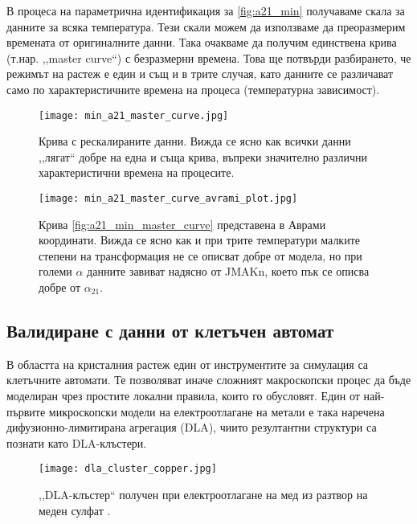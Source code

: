 В процеса на параметрична идентификация за \autoref{fig:a21_min} получаваме скала за данните за всяка температура. Тези скали можем да използваме да преоразмерим времената от оригиналните данни. Така очакваме да получим единствена крива (т.нар. ,,master curve``) с безразмерни времена. Това ще потвърди разбирането, че режимът на растеж е един и същ и в трите случая, като данните се различават само по характеристичните времена на процеса (температурна зависимост).
\begin{figure}[hbpt]
    \centering
    \texttt{[image: min\_a21\_master\_curve.jpg]}
    \caption{Крива с рескалираните данни. Вижда се ясно как всички данни ,,лягат`` добре на една и съща крива, въпреки значително различни характеристични времена на процесите.} 
    \label{fig:a21_min_master_curve}
\end{figure}
\begin{figure}[hbpt]
    \centering
    \texttt{[image: min\_a21\_master\_curve\_avrami\_plot.jpg]}
    \caption{Крива \autoref{fig:a21_min_master_curve} представена в Аврами координати. Вижда се ясно как и при трите температури малките степени на трансформация не се описват добре от модела, но при големи $\alpha$ данните завиват надясно от JMAKn, което пък се описва добре от $\alpha_{21}$.}
    \label{fig:a21_min_master_curve_avrami}
\end{figure}

\subsection{Валидиране с данни от клетъчен автомат}
В областта на кристалния растеж един от инструментите за симулация са клетъчните автомати. Те позволяват иначе сложният макроскопски процес да бъде моделиран чрез простите локални правила, които го обусловят. Един от най-първите микроскопски модели на електроотлагане на метали е така наречена дифузионно-лимитирана агрегация (DLA), чиито резултантни структури са познати като DLA-клъстери. 
\begin{figure}[hbpt]
    \centering
    \texttt{[image: dla\_cluster\_copper.jpg]}
    \caption{,,DLA-клъстер`` получен при електроотлагане на мед из разтвор на меден сулфат \cite{dla_copper}.}
    \label{fig:dla_cluster_wikimedia}
\end{figure}

